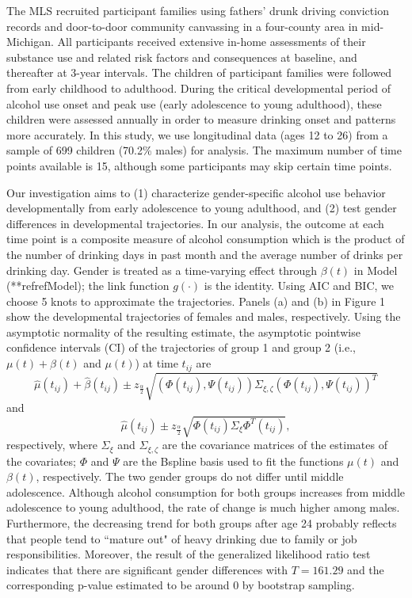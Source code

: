 The MLS recruited participant families using fathers' drunk
driving conviction records and door-to-door community canvassing
in a four-county area in mid-Michigan. All participants received
extensive in-home assessments of their substance use and related
risk factors and consequences at baseline, and thereafter at
3-year intervals. The children of participant families were
followed from early childhood to adulthood. During the critical
developmental period of alcohol use onset and peak use (early
adolescence to young adulthood), these children were assessed
annually in order to measure drinking onset and patterns more
accurately. In this study, we use longitudinal data (ages 12 to
26) from a sample of 699 children (70.2\% males) for analysis. The
maximum number of time points available is 15, although some
participants may skip certain time points.

Our investigation aims to (1) characterize gender-specific alcohol
use behavior developmentally from early adolescence to young
adulthood, and (2) test gender differences in developmental
trajectories. In our analysis, the outcome at each time point is a
composite measure of alcohol consumption which is the product of
the number of drinking days in past month and the average number
of drinks per drinking day. Gender is treated as a time-varying
effect through $\beta(t)$ in Model (**refref{Model}); the link
function $g(\cdot)$ is the identity. Using AIC and BIC, we choose
5 knots to approximate the trajectories. Panels (a) and (b) in
Figure 1 show the developmental trajectories of females and males,
respectively. Using the asymptotic normality of the resulting
estimate, the asymptotic pointwise confidence intervals (CI) of
the trajectories of group 1 and group 2 (i.e., $\mu(t)+\beta(t)$
and $\mu(t)$) at time $t_{ij}$ are
$$
\hat{\mu}(t_{ij}) + \hat{\beta}(t_{ij})\pm
z_{\frac{\alpha}{2}}\sqrt{(\Phi(t_{ij}),\Psi(t_{ij}))\Sigma_{\xi,\zeta}(\Phi(t_{ij}),\Psi(t_{ij}))^{T}}$$
and
$$
\hat{\mu}(t_{ij})\pm
z_{\frac{\alpha}{2}}\sqrt{\Phi(t_{ij})\Sigma_{\xi}\Phi^{T}(t_{ij})},
$$
respectively, where $\Sigma_{\xi}$ and $\Sigma_{\xi,\zeta}$ are
the covariance matrices of the estimates of the covariates; $\Phi$
and $\Psi$ are the Bspline basis used to fit the functions
$\mu(t)$ and $\beta(t)$, respectively. The two gender groups do
not differ until middle adolescence. Although alcohol consumption
for both groups increases from middle adolescence to young
adulthood, the rate of change is much higher among males.
Furthermore, the decreasing trend for both groups after age 24
probably reflects that people tend to ``mature out" of heavy
drinking due to family or job responsibilities. Moreover, the
result of the generalized likelihood ratio test indicates that
there are significant gender differences with $T=161.29$ and the
corresponding p-value estimated to be around $0$ by bootstrap
sampling.

